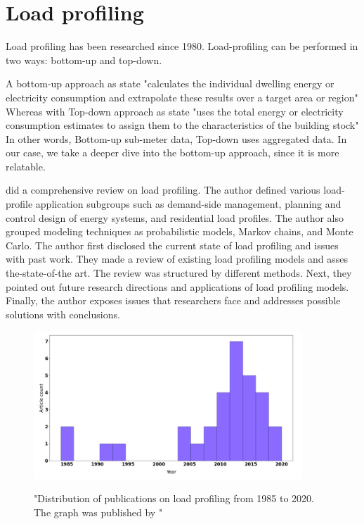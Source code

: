 \documentclass[
11pt, %
english, %
singlespacing, %
headsepline, %
]{MastersDoctoralThesis} %
\begin{document}
\section{Load profiling}

Load profiling has been researched since 1980. Load-profiling can be performed in two ways: bottom-up and top-down. 

A bottom-up approach as \cite{SWAN20091819} state "calculates the individual dwelling energy or electricity consumption and extrapolate these results over a target area or region"
Whereas with Top-down approach as \cite{SWAN20091819} state "uses the total energy or electricity consumption estimates to assign them to the characteristics of the building stock"
In other words, Bottom-up sub-meter data, Top-down uses aggregated data. In our case, we take a deeper dive into the bottom-up approach, since it is more relatable.

\cite{Review2021} did a comprehensive review on load profiling. The author defined various load-profile application
subgroups such as demand-side management, planning and control design of energy systems, and residential load profiles. The author also 
grouped modeling techniques as probabilistic models, Markov chains, and Monte Carlo. The author first disclosed the current state of load profiling and issues with past work.
They made a review of existing load profiling models
and asses the-state-of-the art. The review was structured by different methods. Next, they pointed out future research directions
and applications of load profiling models. Finally, the author exposes issues that researchers face and addresses possible solutions with conclusions.

\begin{figure}[h!]
	\centering
	\caption{"Distribution of publications on load profiling from 1985 to 2020. The graph was published by \protect\cite{Review2021}"}
	\includegraphics[width=0.9\textwidth]{Figures/publications.png}
	\label{fig:Distribution}
\end{figure}
\end{document}
